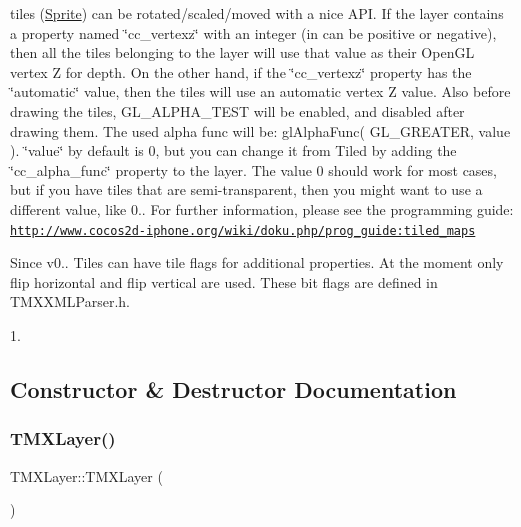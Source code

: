 \begin{DoxyItemize}
\item tiles (\hyperlink{classSprite}{Sprite}) can be rotated/scaled/moved with a nice A\+PI. If the layer contains a property named \char`\"{}cc\+\_\+vertexz\char`\"{} with an integer (in can be positive or negative), then all the tiles belonging to the layer will use that value as their Open\+GL vertex Z for depth. On the other hand, if the \char`\"{}cc\+\_\+vertexz\char`\"{} property has the \char`\"{}automatic\char`\"{} value, then the tiles will use an automatic vertex Z value. Also before drawing the tiles, G\+L\+\_\+\+A\+L\+P\+H\+A\+\_\+\+T\+E\+ST will be enabled, and disabled after drawing them. The used alpha func will be\+: gl\+Alpha\+Func( G\+L\+\_\+\+G\+R\+E\+A\+T\+E\+R, value ). \char`\"{}value\char`\"{} by default is 0, but you can change it from Tiled by adding the \char`\"{}cc\+\_\+alpha\+\_\+func\char`\"{} property to the layer. The value 0 should work for most cases, but if you have tiles that are semi-\/transparent, then you might want to use a different value, like 0.. For further information, please see the programming guide\+: \href{http://www.cocos2d-iphone.org/wiki/doku.php/prog_guide:tiled_maps}{\tt http\+://www.\+cocos2d-\/iphone.\+org/wiki/doku.\+php/prog\+\_\+guide\+:tiled\+\_\+maps} \begin{DoxySince}{Since}
v0.. Tiles can have tile flags for additional properties. At the moment only flip horizontal and flip vertical are used. These bit flags are defined in T\+M\+X\+X\+M\+L\+Parser.\+h. 

1. 
\end{DoxySince}

\end{DoxyItemize}

\subsection{Constructor \& Destructor Documentation}
\mbox{\label{classTMXLayer_a24b45a43f69749ee9c63e94eb0bcad96}} 
\subsubsection{\texorpdfstring{T\+M\+X\+Layer()}{TMXLayer()}\hspace{0.1cm}{\footnotesize\ttfamily [1/2]}}
{\footnotesize\ttfamily T\+M\+X\+Layer\+::\+T\+M\+X\+Layer (\begin{DoxyParamCaption}{ }\end{DoxyParamCaption})}

